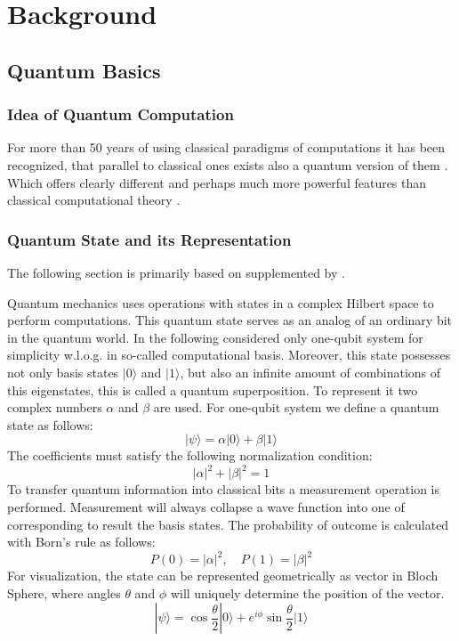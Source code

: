
\chapter{Background}\label{chapter:background}
\section{Quantum Basics}
\subsection{Idea of Quantum Computation}
For more than 50 years of using classical paradigms of computations it has been recognized, 
that parallel to classical ones exists also a quantum version of them \parencite{Barenco_1995}.
Which offers clearly different and perhaps much more powerful features than classical computational theory
\parencite{Markov_2014,article}.

\subsection{Quantum State and its Representation}
The following section is primarily based on \parencite{nielsen00} supplemented by \parencite{article,Markov_2014}. 

Quantum mechanics uses operations with states in a complex Hilbert space to perform computations.
This quantum state serves as an analog of an ordinary bit in the quantum world. 
In the following considered only one-qubit system for simplicity w.l.o.g. in so-called computational basis.
Moreover, this state possesses not only basis states \(|0\rangle\) and \(|1\rangle\),
but also an infinite amount of combinations of this eigenstates, this is called a quantum superposition. 
To represent it two complex numbers \(\alpha\) and \(\beta\) are used.
For one-qubit system we define a quantum state as follows:
\[
|\psi\rangle = \alpha|0\rangle + \beta|1\rangle
\]
The coefficients must satisfy the following normalization condition:
\[
|\alpha|^2 + |\beta|^2 = 1
\]
To transfer quantum information into classical bits a measurement operation is performed.
Measurement will always collapse a wave function into one of corresponding to result the basis states. 
The probability of outcome is calculated with Born's rule as follows:
\[
P(0) = |\alpha|^2, \quad P(1) = |\beta|^2
\]
For visualization, the state can be represented geometrically as vector in Bloch Sphere, 
where angles \(\theta\) and \(\phi\) will uniquely determine the position of the vector. 
\[
|\psi\rangle = \cos\frac{\theta}{2}|0\rangle + e^{i\phi}\sin\frac{\theta}{2}|1\rangle
\]




